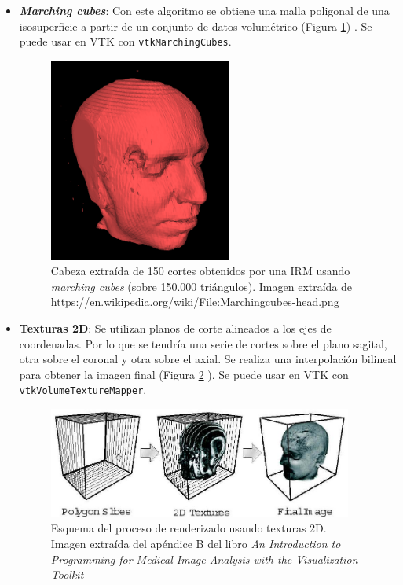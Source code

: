 \begin{itemize}
	\item \textbf{\textit{Marching cubes}}: Con este algoritmo se obtiene una malla poligonal de una isosuperficie a partir de un conjunto de datos volumétrico (Figura \ref{fig:marching_cubes_head}) \cite{marching_cubes}. Se puede usar en VTK con \texttt{vtkMarchingCubes}.
	\begin{figure}[H]
		\centering
		\includegraphics[width=6cm]{imagenes/marching_cubes_head}
		\caption{Cabeza extraída de 150 cortes obtenidos por una IRM usando \textit{marching cubes} (sobre 150.000 triángulos). Imagen extraída de \url{https://en.wikipedia.org/wiki/File:Marchingcubes-head.png}}
		\label{fig:marching_cubes_head}
	\end{figure}
	
	\item \textbf{Texturas 2D}: Se utilizan planos de corte alineados a los ejes de coordenadas. Por lo que se tendría una serie de cortes sobre el plano sagital, otra sobre el coronal y otra sobre el axial. Se realiza una interpolación bilineal para obtener la imagen final (Figura \ref{fig:texturas2d} \cite{intro_medical_vtk_bioimage}). Se puede usar en VTK con \texttt{vtkVolumeTextureMapper}.
	\begin{figure}[H]
		\centering
		\includegraphics[width=10cm]{imagenes/texturas2d}
		\caption{Esquema del proceso de renderizado usando texturas 2D. Imagen extraída del apéndice B del libro \textit{An Introduction to Programming for Medical Image Analysis with the Visualization Toolkit }\cite{intro_medical_vtk_bioimage}}
		\label{fig:texturas2d}
	\end{figure}
	

\end{itemize}
